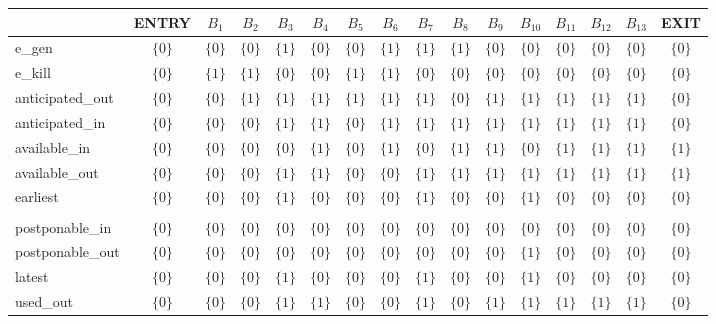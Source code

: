 \begin{table}[ht]
\centering
\begin{tabular}{l|c|c|c|c|c|c|c|c|c|c|c|c|c|c|c}
	& ENTRY & $B_{1}$ & $B_{2}$ & $B_{3}$ & $B_{4}$ & $B_{5}$ & $B_{6}$ & $B_{7}$ & $B_{8}$ & $B_{9}$ & $B_{10}$ & $B_{11}$ & $B_{12}$ & $B_{13}$ & EXIT \\
\hline
e\_gen & $\{0\}$ & $\{0\}$ & $\{0\}$ & $\{1\}$ & $\{0\}$ & $\{0\}$ & $\{1\}$ & $\{1\}$ & $\{1\}$ & $\{0\}$ & $\{0\}$ & $\{0\}$ & $\{0\}$ & $\{0\}$ & $\{0\}$ \\
e\_kill & $\{0\}$ & $\{1\}$ & $\{1\}$ & $\{0\}$ & $\{0\}$ & $\{1\}$ & $\{1\}$ & $\{0\}$ & $\{0\}$ & $\{0\}$ & $\{0\}$ & $\{0\}$ & $\{0\}$ & $\{0\}$ & $\{0\}$ \\
anticipated\_out & $\{0\}$ & $\{0\}$ & $\{1\}$ & $\{1\}$ & $\{1\}$ & $\{1\}$ & $\{1\}$ & $\{1\}$ & $\{0\}$ & $\{1\}$ & $\{1\}$ & $\{1\}$ & $\{1\}$ & $\{1\}$ & $\{0\}$ \\
anticipated\_in & $\{0\}$ & $\{0\}$ & $\{0\}$ & $\{1\}$ & $\{1\}$ & $\{0\}$ & $\{1\}$ & $\{1\}$ & $\{1\}$ & $\{1\}$ & $\{1\}$ & $\{1\}$ & $\{1\}$ & $\{1\}$ & $\{0\}$ \\
available\_in & $\{0\}$ & $\{0\}$ & $\{0\}$ & $\{0\}$ & $\{1\}$ & $\{0\}$ & $\{1\}$ & $\{0\}$ & $\{1\}$ & $\{1\}$ & $\{0\}$ & $\{1\}$ & $\{1\}$ & $\{1\}$ & $\{1\}$ \\
available\_out & $\{0\}$ & $\{0\}$ & $\{0\}$ & $\{1\}$ & $\{1\}$ & $\{0\}$ & $\{0\}$ & $\{1\}$ & $\{1\}$ & $\{1\}$ & $\{1\}$ & $\{1\}$ & $\{1\}$ & $\{1\}$ & $\{1\}$ \\
earliest & $\{0\}$ & $\{0\}$ & $\{0\}$ & $\{1\}$ & $\{0\}$ & $\{0\}$ & $\{0\}$ & $\{1\}$ & $\{0\}$ & $\{0\}$ & $\{1\}$ & $\{0\}$ & $\{0\}$ & $\{0\}$ & $\{0\}$ \\
 &  &  &  &  &  &  &  &  &  &  &  &  &  &  &  \\
postponable\_in & $\{0\}$ & $\{0\}$ & $\{0\}$ & $\{0\}$ & $\{0\}$ & $\{0\}$ & $\{0\}$ & $\{0\}$ & $\{0\}$ & $\{0\}$ & $\{0\}$ & $\{0\}$ & $\{0\}$ & $\{0\}$ & $\{0\}$ \\
postponable\_out & $\{0\}$ & $\{0\}$ & $\{0\}$ & $\{0\}$ & $\{0\}$ & $\{0\}$ & $\{0\}$ & $\{0\}$ & $\{0\}$ & $\{0\}$ & $\{1\}$ & $\{0\}$ & $\{0\}$ & $\{0\}$ & $\{0\}$ \\
latest & $\{0\}$ & $\{0\}$ & $\{0\}$ & $\{1\}$ & $\{0\}$ & $\{0\}$ & $\{0\}$ & $\{1\}$ & $\{0\}$ & $\{0\}$ & $\{1\}$ & $\{0\}$ & $\{0\}$ & $\{0\}$ & $\{0\}$ \\
used\_out & $\{0\}$ & $\{0\}$ & $\{0\}$ & $\{1\}$ & $\{1\}$ & $\{0\}$ & $\{0\}$ & $\{1\}$ & $\{0\}$ & $\{1\}$ & $\{1\}$ & $\{1\}$ & $\{1\}$ & $\{1\}$ & $\{0\}$ \\

\end{tabular}
\end{table}
